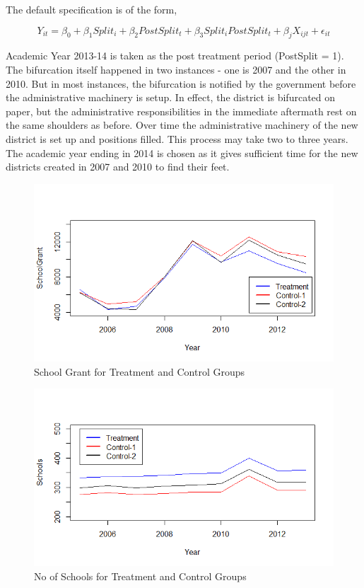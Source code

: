 \documentclass[12pt, a4paper]{article}
\begin{document}
The default specification is of the form,

\[ Y_{it} = \beta_0 + \beta_1 Split_{i} + \beta_2 PostSplit_t + \beta_3 Split_i PostSplit_t + \beta_j X_{ijt} + \epsilon_{it} \]

Academic Year 2013-14 is taken as the post treatment period (PostSplit = 1). The bifurcation itself happened in two instances - one is 2007 and the other in 2010. But in most instances, the bifurcation is notified by the government before the administrative machinery is setup. In effect, the district is bifurcated on paper, but the administrative responsibilities in the immediate aftermath rest on the same shoulders as before. Over time the administrative machinery of the new district is set up and positions filled. This process may take two to three years. The academic year ending in 2014 is chosen as it gives sufficient time for the new districts created in 2007 and 2010 to find their feet.

\begin{figure}[h!]
	\centering
	\includegraphics[scale = 0.85]{SchoolGrant}
	\caption{School Grant for Treatment and Control Groups}
	\label{Fig3}
\end{figure}

\begin{figure}[h!]
	\centering
	\includegraphics[scale = 0.85]{Schools}
	\caption{No of Schools for Treatment and Control Groups}
	\label{Fig4}
\end{figure}
\end{document}
